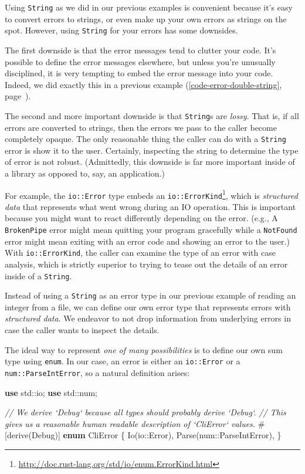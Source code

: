 \documentclass[a4paper,]{book}
\renewcommand*{\hyperlink}[2]{%
 #2 (\autoref{#1}, page~\pageref{#1})}
\newenvironment{Shaded}{\begin{snugshade}}{\end{snugshade}}
\newcommand{\KeywordTok}[1]{\textcolor[rgb]{0.13,0.29,0.53}{\textbf{{#1}}}}
\newcommand{\CommentTok}[1]{\textcolor[rgb]{0.56,0.35,0.01}{\textit{{#1}}}}
\newcommand{\BuiltInTok}[1]{{#1}}
\newcommand{\AttributeTok}[1]{\textcolor[rgb]{0.77,0.63,0.00}{{#1}}}
\newcommand{\NormalTok}[1]{{#1}}
\renewcommand{\href}[2]{#2\footnote{\url{#1}}}
\begin{document}
Using \texttt{String} as we did in our previous examples is convenient
because it's easy to convert errors to strings, or even make up your own
errors as strings on the spot. However, using \texttt{String} for your
errors has some downsides.

The first downside is that the error messages tend to clutter your code.
It's possible to define the error messages elsewhere, but unless you're
unusually disciplined, it is very tempting to embed the error message
into your code. Indeed, we did exactly this in a
\protect\hyperlink{code-error-double-string}{previous example}.

The second and more important downside is that \texttt{String}s are
\emph{lossy}. That is, if all errors are converted to strings, then the
errors we pass to the caller become completely opaque. The only
reasonable thing the caller can do with a \texttt{String} error is show
it to the user. Certainly, inspecting the string to determine the type
of error is not robust. (Admittedly, this downside is far more important
inside of a library as opposed to, say, an application.)

For example, the \texttt{io::Error} type embeds an
\href{http://doc.rust-lang.org/std/io/enum.ErrorKind.html}{\texttt{io::ErrorKind}},
which is \emph{structured data} that represents what went wrong during
an IO operation. This is important because you might want to react
differently depending on the error. (e.g., A \texttt{BrokenPipe} error
might mean quitting your program gracefully while a \texttt{NotFound}
error might mean exiting with an error code and showing an error to the
user.) With \texttt{io::ErrorKind}, the caller can examine the type of
an error with case analysis, which is strictly superior to trying to
tease out the details of an error inside of a \texttt{String}.

Instead of using a \texttt{String} as an error type in our previous
example of reading an integer from a file, we can define our own error
type that represents errors with \emph{structured data}. We endeavor to
not drop information from underlying errors in case the caller wants to
inspect the details.

The ideal way to represent \emph{one of many possibilities} is to define
our own sum type using \texttt{enum}. In our case, an error is either an
\texttt{io::Error} or a \texttt{num::ParseIntError}, so a natural
definition arises:

\begin{Shaded}
\begin{Highlighting}[]
\KeywordTok{use} \NormalTok{std::io;}
\KeywordTok{use} \NormalTok{std::num;}

\CommentTok{// We derive `Debug` because all types should probably derive `Debug`.}
\CommentTok{// This gives us a reasonable human readable description of `CliError` values.}
\AttributeTok{#[}\NormalTok{derive}\AttributeTok{(}\BuiltInTok{Debug}\AttributeTok{)]}
\KeywordTok{enum} \NormalTok{CliError \{}
    \NormalTok{Io(io::Error),}
    \NormalTok{Parse(num::ParseIntError),}
\NormalTok{\}}
\end{Highlighting}
\end{Shaded}
\end{document}
